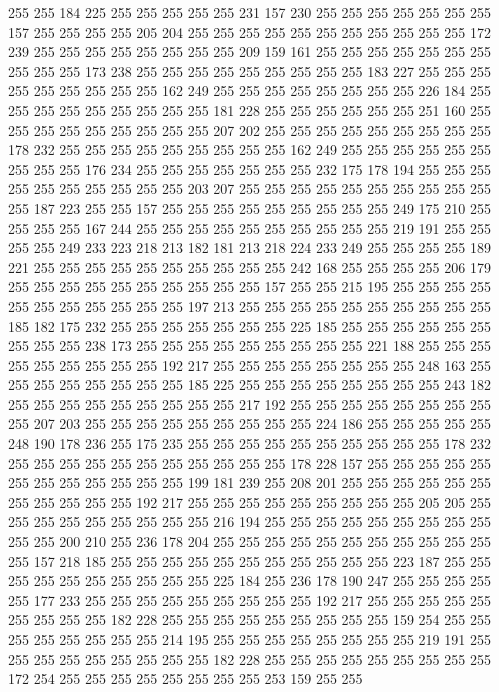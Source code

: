 255 255 184 225 255 255 255 255 255 231 157 230 255 255 255 255 255 255 255 157
255 255 255 255 205 204 255 255 255 255 255 255 255 255 255 255 255 172 239 255
255 255 255 255 255 255 255 209 159 161 255 255 255 255 255 255 255 255 255 255
173 238 255 255 255 255 255 255 255 255 255 183 227 255 255 255 255 255 255 255
255 255 162 249 255 255 255 255 255 255 255 255 226 184 255 255 255 255 255 255
255 255 255 181 228 255 255 255 255 255 255 251 160 255 255 255 255 255 255 255
255 255 207 202 255 255 255 255 255 255 255 255 255 178 232 255 255 255 255 255
255 255 255 255 162 249 255 255 255 255 255 255 255 255 255 176 234 255 255 255
255 255 255 255 232 175 178 194 255 255 255 255 255 255 255 255 255 255 203 207
255 255 255 255 255 255 255 255 255 255 255 187 223 255 255 157 255 255 255 255
255 255 255 255 255 249 175 210 255 255 255 255 167 244 255 255 255 255 255 255
255 255 255 255 219 191 255 255 255 255 249 233 223 218 213 182 181 213 218 224
233 249 255 255 255 255 189 221 255 255 255 255 255 255 255 255 255 255 242 168
255 255 255 255 206 179 255 255 255 255 255 255 255 255 255 255 157 255 255 215
195 255 255 255 255 255 255 255 255 255 255 255 197 213 255 255 255 255 255 255
255 255 255 255 185 182 175 232 255 255 255 255 255 255 255 225 185 255 255 255
255 255 255 255 255 255 238 173 255 255 255 255 255 255 255 255 255 221 188 255
255 255 255 255 255 255 255 255 192 217 255 255 255 255 255 255 255 255 248 163
255 255 255 255 255 255 255 255 185 225 255 255 255 255 255 255 255 255 243 182
255 255 255 255 255 255 255 255 255 217 192 255 255 255 255 255 255 255 255 255
207 203 255 255 255 255 255 255 255 255 255 224 186 255 255 255 255 255 248 190
178 236 255 175 235 255 255 255 255 255 255 255 255 255 255 178 232 255 255 255
255 255 255 255 255 255 255 255 178 228 157 255 255 255 255 255 255 255 255 255
255 255 255 199 181 239 255 208 201 255 255 255 255 255 255 255 255 255 255 255
192 217 255 255 255 255 255 255 255 255 255 205 205 255 255 255 255 255 255 255
255 255 216 194 255 255 255 255 255 255 255 255 255 255 255 200 210 255 236 178
204 255 255 255 255 255 255 255 255 255 255 255 255 157 218 185 255 255 255 255
255 255 255 255 255 255 255 223 187 255 255 255 255 255 255 255 255 255 255 225
184 255 236 178 190 247 255 255 255 255 255 177 233 255 255 255 255 255 255 255
255 255 192 217 255 255 255 255 255 255 255 255 255 182 228 255 255 255 255 255
255 255 255 255 159 254 255 255 255 255 255 255 255 255 214 195 255 255 255 255
255 255 255 255 219 191 255 255 255 255 255 255 255 255 255 182 228 255 255 255
255 255 255 255 255 255 172 254 255 255 255 255 255 255 255 255 253 159 255 255
